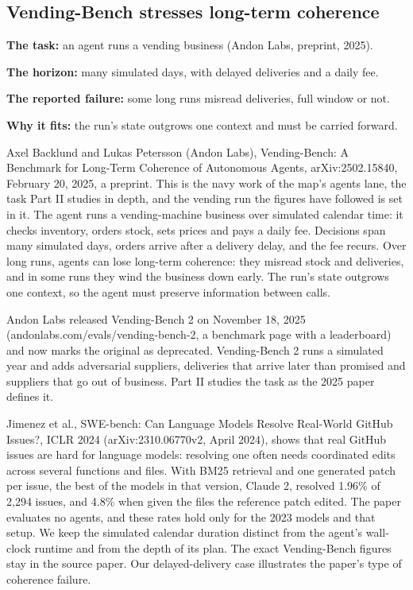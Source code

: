 \subsection{Vending-Bench stresses long-term coherence}
\label{sec:it-8-2}

\bi
\item \textbf{The task:} an agent runs a vending business (Andon Labs, preprint, 2025).
\item \textbf{The horizon:} many simulated days, with delayed deliveries and a daily fee.
\item \textbf{The reported failure:} some long runs misread deliveries, full window or not.
\item \textbf{Why it fits:} the run's state outgrows one context and must be carried forward.
\ei

Axel Backlund and Lukas Petersson (Andon Labs), Vending-Bench: A Benchmark for Long-Term Coherence of Autonomous Agents, arXiv:2502.15840, February 20, 2025, a preprint. This is the navy work of the map's agents lane, the task Part II studies in depth, and the vending run the figures have followed is set in it. The agent runs a vending-machine business over simulated calendar time: it checks inventory, orders stock, sets prices and pays a daily fee. Decisions span many simulated days, orders arrive after a delivery delay, and the fee recurs. Over long runs, agents can lose long-term coherence: they misread stock and deliveries, and in some runs they wind the business down early. The run's state outgrows one context, so the agent must preserve information between calls.

Andon Labs released Vending-Bench 2 on November 18, 2025 (andonlabs.com/evals/vending-bench-2, a benchmark page with a leaderboard) and now marks the original as deprecated. Vending-Bench 2 runs a simulated year and adds adversarial suppliers, deliveries that arrive later than promised and suppliers that go out of business. Part II studies the task as the 2025 paper defines it.

Jimenez et al., SWE-bench: Can Language Models Resolve Real-World GitHub Issues?, ICLR 2024 (arXiv:2310.06770v2, April 2024), shows that real GitHub issues are hard for language models: resolving one often needs coordinated edits across several functions and files. With BM25 retrieval and one generated patch per issue, the best of the models in that version, Claude 2, resolved 1.96\% of 2,294 issues, and 4.8\% when given the files the reference patch edited. The paper evaluates no agents, and these rates hold only for the 2023 models and that setup. We keep the simulated calendar duration distinct from the agent's wall-clock runtime and from the depth of its plan. The exact Vending-Bench figures stay in the source paper. Our delayed-delivery case illustrates the paper's type of coherence failure.

